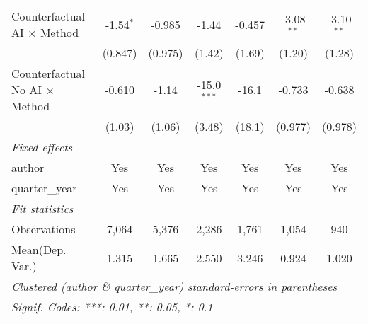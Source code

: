 \begin{tabular}{lcccccc}
   Counterfactual AI $\times$ Method     & -1.54$^{*}$   & -0.985       & -1.44         & -0.457        & -3.08$^{**}$  & -3.10$^{**}$\\   
                                         & (0.847)       & (0.975)      & (1.42)        & (1.69)        & (1.20)        & (1.28)\\   
   Counterfactual No AI $\times$ Method  & -0.610        & -1.14        & -15.0$^{***}$ & -16.1         & -0.733        & -0.638\\   
                                         & (1.03)        & (1.06)       & (3.48)        & (18.1)        & (0.977)       & (0.978)\\   
   \midrule
   \emph{Fixed-effects}\\
   author                                & Yes           & Yes          & Yes           & Yes           & Yes           & Yes\\  
   quarter\_year                         & Yes           & Yes          & Yes           & Yes           & Yes           & Yes\\  
   \midrule
   \emph{Fit statistics}\\
   Observations                          & 7,064         & 5,376        & 2,286         & 1,761         & 1,054         & 940\\  
Mean(Dep. Var.) & 1.315 & 1.665 & 2.550 & 3.246 & 0.924 & 1.020 \\
   \midrule \midrule
   \multicolumn{7}{l}{\emph{Clustered (author \& quarter\_year) standard-errors in parentheses}}\\
   \multicolumn{7}{l}{\emph{Signif. Codes: ***: 0.01, **: 0.05, *: 0.1}}\\
\end{tabular}
\par\endgroup

